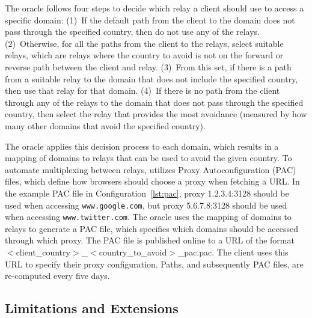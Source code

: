 The oracle follows four steps to decide which relay a client should
use to access a specific domain: (1)~If the default path from the
client to the domain does not pass through the specified country, then
do not use any of the relays.  (2)~Otherwise, for all the paths from
the client to the relays, select suitable relays, which are relays where the country 
to avoid is not on the forward or reverse path between the client and 
relay.  (3)~From this set, if there
is a path from a suitable relay to the domain that does not include
the specified country, then use that relay for that domain.  (4)~If
there is no path from the client through any of the relays to the
domain that does not pass through the specified country, then select
the relay that provides the most avoidance (measured by how many other
domains that avoid the specified country).

\begin{figure}[t]
\centering
\resizebox{.4\textwidth}{!}{
\renewcommand{\lstlistingname}{Configuration}

\vspace*{-0.25in}
}
\end{figure}

The oracle applies this decision process to each domain, which results
in a mapping of domains to relays that can be used to avoid the given
country.  To automate multiplexing between relays,
\system{} utilizes Proxy Autoconfiguration (PAC) files, which define
how browsers should choose a proxy when fetching a URL.  In the
example PAC file in Configuration~\ref{lst:pac}, proxy 1.2.3.4:3128
should be used when accessing {\tt www.google.com}, but proxy
5.6.7.8:3128 should be used when accessing {\tt www.twitter.com}.  The
oracle uses the mapping of domains to relays to generate a PAC file,
which specifies which domains should be accessed through which proxy.
The PAC file is published online to a URL of the format
$<$client\_country$>$\_$<$country\_to\_avoid$>$\_pac.pac.  The client
uses this URL to specify their proxy configuration.  Paths, and subsequently PAC files, are
re-computed every five days.

\subsection{Limitations and Extensions}


